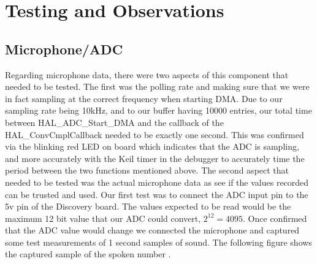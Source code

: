 \section{Testing and Observations}

\subsection{Microphone/ADC}
Regarding microphone data, there were two aspects of this component that needed to be tested. The first was the polling rate and making sure that we were in fact sampling at the correct frequency when starting DMA. Due to our sampling rate being 10kHz, and to our buffer having 10000 entries, our total time between HAL\_ADC\_Start\_DMA and the callback of the HAL\_ConvCmplCallback needed to be exactly one second. This was confirmed via the blinking red LED on board which indicates that the ADC is sampling, and more accurately with the Keil timer in the debugger to accurately time the period between the two functions mentioned above. The second aspect that needed to be tested was the actual microphone data as see if the values recorded can be trusted and used. Our first test was to connect the ADC input pin to the 5v pin of the Discovery board. The values expected to be read would be the maximum 12 bit value that our ADC could convert, $2^{12} = 4095$. Once confirmed that the ADC value would change we connected the microphone and captured some test measurements of 1 second samples of sound. The following figure shows the captured sample of the spoken number .

